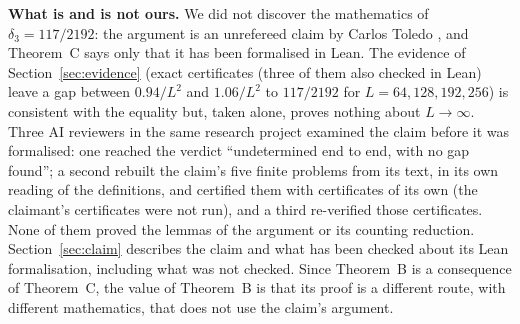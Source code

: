\documentclass[11pt]{amsart}
\theoremstyle{remark}
\begin{document}
\medskip\noindent\textbf{What is and is not ours.} We did not discover the mathematics of $\delta_3=117/2192$: the argument is an unrefereed claim by Carlos Toledo \cite{Toledo26}, and Theorem~C says only that it has been formalised in Lean. The evidence of Section~\ref{sec:evidence} (exact certificates (three of them also checked in Lean) leave a
gap between $0.94/L^2$ and $1.06/L^2$ to $117/2192$ for $L=64,128,192,256$) is consistent with the equality but, taken alone, proves nothing about $L\to\infty$. Three AI reviewers in the same research project examined the claim before it was formalised: one reached the verdict ``undetermined end to end, with no gap found''; a second rebuilt the claim's five finite problems from its text, in its own reading of the definitions, and certified them with certificates of its own (the claimant's certificates were not run), and a third re-verified those certificates. None of them proved the lemmas of the argument or its counting reduction. Section~\ref{sec:claim} describes the claim and what has been checked about its Lean formalisation, including what was not checked. Since Theorem~B is a consequence of Theorem~C, the value of Theorem~B is that its proof is a different route, with different mathematics, that does not use the claim's argument.
\end{document}
